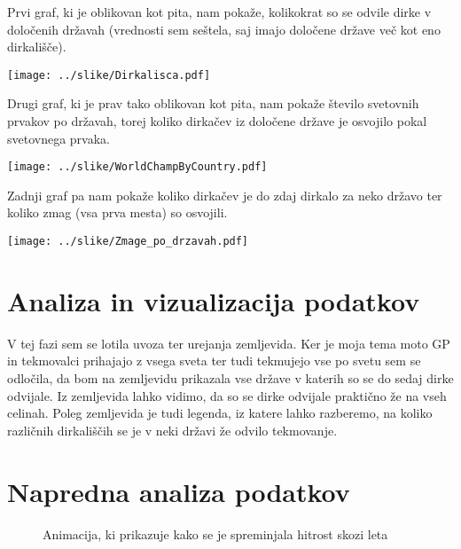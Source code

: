 \documentclass[11pt,a4paper]{article}
\begin{document}
\bigskip

Prvi graf, ki je oblikovan kot pita, nam pokaže, kolikokrat so se odvile dirke v določenih državah (vrednosti sem seštela, saj imajo določene države več kot eno dirkališče).

\texttt{[image: ../slike/Dirkalisca.pdf]}

\newpage
Drugi graf, ki je prav tako oblikovan kot pita, nam pokaže število svetovnih prvakov po državah, torej koliko dirkačev iz določene države je osvojilo pokal svetovnega prvaka.

\texttt{[image: ../slike/WorldChampByCountry.pdf]}

\newpage
Zadnji graf pa nam pokaže koliko dirkačev je do zdaj dirkalo za neko državo ter koliko zmag (vsa prva mesta) so osvojili.

\texttt{[image: ../slike/Zmage\_po\_drzavah.pdf]}

\newpage
\section{Analiza in vizualizacija podatkov}

V tej fazi sem se lotila uvoza ter urejanja zemljevida. Ker je moja tema moto GP in tekmovalci prihajajo z vsega sveta ter tudi tekmujejo vse po svetu sem se odločila, da bom na zemljevidu prikazala vse države v katerih so se do sedaj dirke odvijale. Iz zemljevida lahko vidimo, da so se dirke odvijale praktično že na vseh celinah. Poleg zemljevida je tudi legenda, iz katere lahko razberemo, na koliko različnih dirkališčih se je v neki državi že odvilo tekmovanje. 



\section{Napredna analiza podatkov}



 
\pagebreak 
\begin{figure}[H] 
\caption{Animacija, ki prikazuje kako se je spreminjala hitrost skozi leta} 
\end{figure} 


\end{document}
